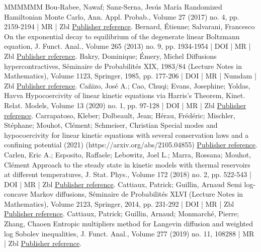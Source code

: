 \documentclass[10pt,a4paper]{article}
\numberwithin{equation}{section}
\begin{document}
\begin{thebibliography}{MMMMMM}
 Bou-Rabee, Nawaf; Sanz-Serna, Jesús María Randomized Hamiltonian Monte Carlo, Ann. Appl. Probab., Volume 27 (2017) no. 4, pp. 2159-2194 | MR | Zbl \href{https://ahl.centre-mersenne.org/item/AHL_2022__5__523_0/#BRSS17}{Publisher reference}.
 Bernard, Étienne; Salvarani, Francesco On the exponential decay to equilibrium of the degenerate linear Boltzmann equation, J. Funct. Anal., Volume 265 (2013) no. 9, pp. 1934-1954 | DOI | MR | Zbl \href{https://ahl.centre-mersenne.org/item/AHL_2022__5__523_0/#BS13}{Publisher reference}.
 Bakry, Dominique; Émery, Michel Diffusions hypercontractives, Séminaire de Probabilités XIX, 1983/84 (Lecture Notes in Mathematics), Volume 1123, Springer, 1985, pp. 177-206 | DOI | MR | Numdam | Zbl \href{https://ahl.centre-mersenne.org/item/AHL_2022__5__523_0/#BE85}{Publisher reference}.
 Cañizo, José A.; Cao, Chuqi; Evans, Josephine; Yoldas, Havva Hypocoercivity of linear kinetic equations via Harris’s Theorem, Kinet. Relat. Models, Volume 13 (2020) no. 1, pp. 97-128 | DOI | MR | Zbl \href{https://ahl.centre-mersenne.org/item/AHL_2022__5__523_0/#CCEY19}{Publisher reference}.
 Carrapatoso, Kleber; Dolbeault, Jean; Hérau, Frédéric; Mischler, Stéphane; Mouhot, Clément; Schmeiser, Christian Special modes and hypocoercivity for linear kinetic equations with several conservation laws and a confining potential (2021) (https://arxiv.org/abs/2105.04855) \href{https://ahl.centre-mersenne.org/item/AHL_2022__5__523_0/#CDHMMS21}{Publisher reference}.
 Carlen, Eric A.; Esposito, Raffaele; Lebowitz, Joel L.; Marra, Rossana; Mouhot, Clément Approach to the steady state in kinetic models with thermal reservoirs at different temperatures, J. Stat. Phys., Volume 172 (2018) no. 2, pp. 522-543 | DOI | MR | Zbl \href{https://ahl.centre-mersenne.org/item/AHL_2022__5__523_0/#CELMM}{Publisher reference}.
 Cattiaux, Patrick; Guillin, Arnaud Semi log-concave Markov diffusions, Séminaire de Probabilités XLVI (Lecture Notes in Mathematics), Volume 2123, Springer, 2014, pp. 231-292 | DOI | MR | Zbl \href{https://ahl.centre-mersenne.org/item/AHL_2022__5__523_0/#CG14}{Publisher reference}.
 Cattiaux, Patrick; Guillin, Arnaud; Monmarché, Pierre; Zhang, Chaoen Entropic multipliers method for Langevin diffusion and weighted log Sobolev inequalities, J. Funct. Anal., Volume 277 (2019) no. 11, 108288 | MR | Zbl \href{https://ahl.centre-mersenne.org/item/AHL_2022__5__523_0/#CGMZ19}{Publisher reference}.

\end{thebibliography}
\end{document}
